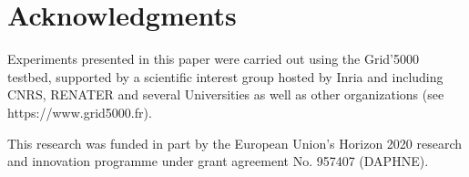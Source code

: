 \documentclass[sigconf,natbib=false]{acmart}
\begin{document}
%

\newpage
\section*{Acknowledgments}


Experiments presented in this paper were carried out using the Grid'5000 testbed, supported by a scientific interest group hosted by Inria and including CNRS, RENATER and several Universities as well as other organizations (see https://www.grid5000.fr). 

This research was funded in part by the European Union’s Horizon 2020 research and innovation programme under grant agreement No. 957407 (DAPHNE).


%
%
\printbibliography
\end{document}
